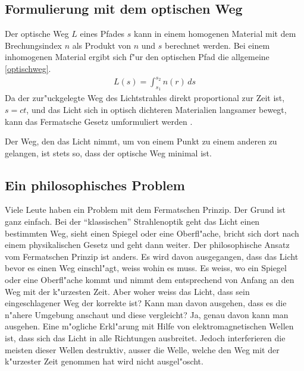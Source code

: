 \subsection{Formulierung mit dem optischen Weg}
Der optische Weg $L$  eines Pfades $s$ kann in einem homogenen Material 
mit dem Brechungsindex $n$ als Produkt von $n$ und $s$ berechnet werden.
Bei einem inhomogenen Material ergibt sich f"ur den optischen Pfad die
allgemeine \eqref{optischweg}.
\begin{align}
	L(s) = \int_{s_1}^{s_2} n(r) \,ds 
	\label{optischweg}
\end{align}
Da der zur"uckgelegte Weg des Lichtstrahles direkt proportional zur Zeit
ist, $s = c t$,
und das Licht sich in optisch dichteren Materialien langsamer bewegt,
kann das Fermatsche Gesetz umformuliert werden \cite{DefinitionFermat}. 
\begin{postulat}
Der Weg, den das Licht nimmt, um von einem Punkt zu einem anderen zu
gelangen, ist stets so, dass der optische Weg minimal ist.
\end{postulat}
\subsection{Ein philosophisches Problem}
Viele Leute haben ein Problem mit dem Fermatschen Prinzip. 
Der Grund ist ganz einfach. 
Bei der ``klassischen'' Strahlenoptik geht das Licht einen bestimmten Weg, 
sieht einen Spiegel oder eine Oberfl"ache, bricht sich dort nach einem 
physikalischen Gesetz und geht dann weiter.
Der philosophische Ansatz vom Fermatschen Prinzip ist anders. 
Es wird davon ausgegangen, dass das Licht bevor es einen Weg einschl"agt, 
weiss wohin es muss. Es weiss, wo ein Spiegel oder eine Oberfl"ache kommt und 
nimmt dem entsprechend von Anfang an den Weg mit der k"urzesten Zeit.
Aber woher weiss das Licht, dass sein eingeschlagener Weg der korrekte ist?
Kann man davon ausgehen, dass es die n"ahere Umgebung anschaut und diese vergleicht?
Ja, genau davon kann man ausgehen.
Eine m"ogliche Erkl"arung mit Hilfe von elektromagnetischen Wellen ist,
dass sich das Licht in alle Richtungen ausbreitet. 
Jedoch interferieren die meisten dieser Wellen destruktiv, 
ausser die Welle, welche den Weg mit der k"urzester Zeit genommen hat
wird nicht ausgel"oscht.
